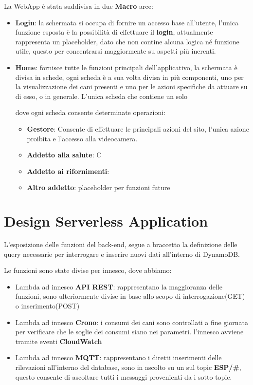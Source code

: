 La WebApp è stata suddivisa in due \textbf{Macro} aree:
\begin{itemize}
    \item \textbf{Login}: la schermata si occupa di fornire un accesso base all'utente, l'unica funzione esposta è la possibilità di effettuare il \textbf{login}, attualmente rappresenta un placeholder, dato che non contine alcuna logica né funzione utile, questo per concentrarsi maggiormente su aspetti più inerenti. 
    \item \textbf{Home}: fornisce tutte le funzioni principali dell'applicativo,
    la schermata è divisa in schede, ogni scheda è a sua volta divisa in più componenti, uno per la visualizzazione dei cani presenti e uno per le azioni specifiche da attuare su di esso, o in generale.
    L'unica scheda che contiene un solo
    
    dove ogni scheda consente determinate operazioni:
    \begin{itemize}
        \item \textbf{Gestore}: Consente di effettuare le principali azioni del sito, l'unica azione proibita e l'accesso alla videocamera.
        \item \textbf{Addetto alla salute}: C
        \item \textbf{Addetto ai rifornimenti}:
        \item \textbf{Altro addetto}: placeholder per funzioni future
    \end{itemize}    
    
\end{itemize}


\section{Design Serverless Application}

L'esposizione delle funzioni del back-end, segue a braccetto la definizione delle query necessarie per interrogare e inserire nuovi dati all'interno di DynamoDB.

Le funzioni sono state divise per innesco, dove abbiamo: 
\begin{itemize}
    \item Lambda ad innesco \textbf{API REST}: rappresentano la maggioranza delle funzioni, sono ulteriormente divise in base allo scopo di interrogazione(GET) o inserimento(POST)
    \item Lambda ad innesco \textbf{Crono}: i consumi dei cani sono controllati a fine giornata per verificare che le soglie dei consumi siano nei parametri. 
    l'innesco avviene tramite eventi \textbf{CloudWatch}
    \item Lambda ad innesco \textbf{MQTT}: rappresentano i diretti inserimenti delle rilevazioni all'interno del database, sono in ascolto su un sul topic \textbf{ESP/\#}, questo consente di ascoltare tutti i messaggi provenienti da i sotto topic.
\end{itemize}


